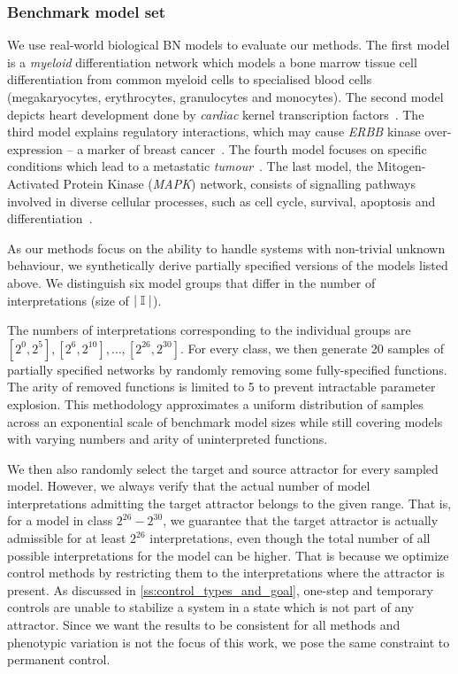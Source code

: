 \subsubsection{Benchmark model set} We use real-world biological BN models to evaluate our methods. The first model is a \emph{myeloid} differentiation network \cite{Krumsiek2011} which models a bone marrow tissue cell differentiation from common myeloid cells to specialised blood cells (megakaryocytes, erythrocytes, granulocytes and monocytes). The second model depicts heart development done by \emph{cardiac} kernel transcription factors~\cite{Waardenberg2014}. The third model explains regulatory interactions, which may cause \emph{ERBB} kinase over-expression -- a marker of breast cancer~\cite{Sahin2009}. The fourth model focuses on specific conditions which lead to a metastatic \emph{tumour}~\cite{Cohen2015}. The last model, the Mitogen-Activated Protein Kinase (\emph{MAPK}) network, consists of signalling pathways involved in diverse cellular processes, such as cell cycle, survival, apoptosis and differentiation~\cite{Grieco2013}. 

As our methods focus on the ability to handle systems with non-trivial unknown behaviour, we synthetically derive partially specified versions of the models listed above. We distinguish six model groups that differ in the number of interpretations (size of $\mid\mathbb{I}\mid$). 

The numbers of interpretations corresponding to the individual groups are $[2^0,2^5], [2^6,2^{10}], \dots, [2^{26},2^{30}]$. For every class, we then generate 20 samples of partially specified networks by randomly removing some fully-specified functions. The arity of removed functions is limited to 5 to prevent intractable parameter explosion. This methodology approximates a uniform distribution of samples across an exponential scale of benchmark model sizes while still covering models with varying numbers and arity of uninterpreted functions. %

We then also randomly select the target and source attractor for every sampled model. However, we always verify that the actual number of model interpretations admitting the target attractor belongs to the given range. That is, for a model in class $2^{26}-2^{30}$, we guarantee that the target attractor is actually admissible for at least $2^{26}$ interpretations, even though the total number of all possible interpretations for the model can be higher. That is because we optimize control methods by restricting them to the interpretations where the attractor is present. As discussed in \autoref{ss:control_types_and_goal}, one-step and temporary controls are unable to stabilize a system in a state which is not part of any attractor. Since we want the results to be consistent for all methods and phenotypic variation is not the focus of this work, we pose the same constraint to permanent control.

